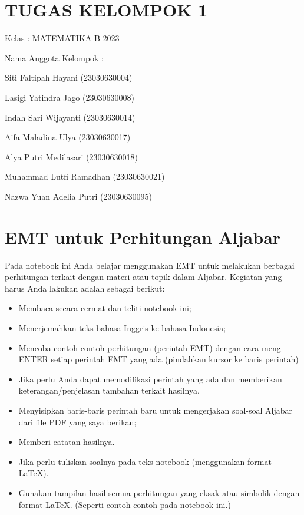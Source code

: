 \documentclass[
]{book}
\author{}
\date{}
\begin{document}
\frontmatter

\mainmatter
\chapter{TUGAS KELOMPOK 1}\label{tugas-kelompok-1}

Kelas : MATEMATIKA B 2023

Nama Anggota Kelompok :

Siti Faltipah Hayani (23030630004)

Lasigi Yatindra Jago (23030630008)

Indah Sari Wijayanti (23030630014)

Aifa Maladina Ulya (23030630017)

Alya Putri Medilasari (23030630018)

Muhammad Lutfi Ramadhan (23030630021)

Nazwa Yuan Adelia Putri (23030630095)

\chapter{EMT untuk Perhitungan Aljabar}\label{emt-untuk-perhitungan-aljabar}

Pada notebook ini Anda belajar menggunakan EMT untuk melakukan berbagai perhitungan terkait dengan materi atau topik dalam Aljabar. Kegiatan yang harus Anda lakukan adalah sebagai berikut:

\begin{itemize}
\item
  Membaca secara cermat dan teliti notebook ini;
\item
  Menerjemahkan teks bahasa Inggris ke bahasa Indonesia;
\item
  Mencoba contoh-contoh perhitungan (perintah EMT) dengan cara meng ENTER setiap perintah EMT yang ada (pindahkan kursor ke baris perintah)
\item
  Jika perlu Anda dapat memodifikasi perintah yang ada dan memberikan keterangan/penjelasan tambahan terkait hasilnya.
\item
  Menyisipkan baris-baris perintah baru untuk mengerjakan soal-soal Aljabar dari file PDF yang saya berikan;
\item
  Memberi catatan hasilnya.
\item
  Jika perlu tuliskan soalnya pada teks notebook (menggunakan format LaTeX).
\item
  Gunakan tampilan hasil semua perhitungan yang eksak atau simbolik dengan format LaTeX. (Seperti contoh-contoh pada notebook ini.)
\end{itemize}
\end{document}
